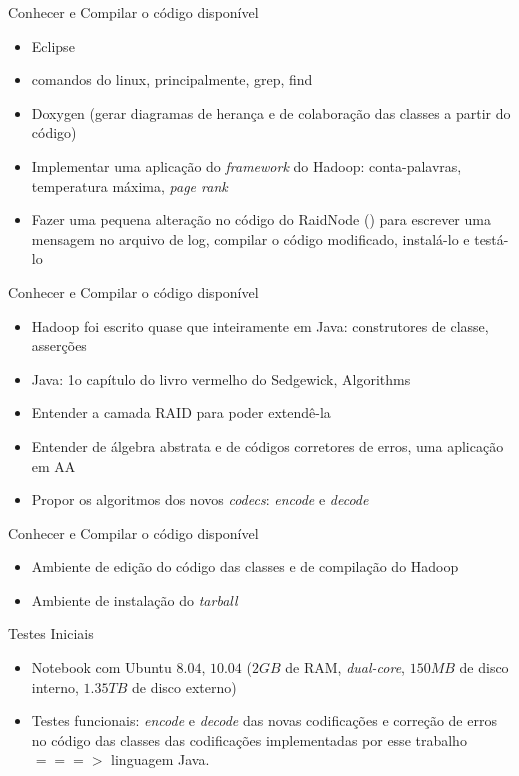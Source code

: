   \begin{frame}{Conhecer e Compilar o código disponível}
     \begin{itemize}
        \item<1-> Eclipse
        \item<2-> comandos do linux, principalmente, grep, find
        \item<3-> Doxygen (gerar diagramas de herança e de colaboração das classes a partir do código)
        \item<4-> Implementar uma aplicação do \emph{framework} do Hadoop: conta-palavras, temperatura máxima, \emph{page rank}
        \item<5-> Fazer uma pequena alteração no código do RaidNode () para escrever uma mensagem no arquivo de log, compilar o código modificado, instalá-lo e testá-lo
     \end{itemize}
  \end{frame}

  \begin{frame}{Conhecer e Compilar o código disponível}
     \begin{itemize}
        \item<1-> Hadoop foi escrito quase que inteiramente em Java: construtores de classe, asserções
        \item<2-> Java: 1o capítulo do livro vermelho do Sedgewick, Algorithms
        \item<3-> Entender a camada RAID para poder extendê-la
        \item<4-> Entender de álgebra abstrata e de códigos corretores de erros, uma aplicação em AA
        \item<5-> Propor os algoritmos dos novos \emph{codecs}: \emph{encode} e \emph{decode}
     \end{itemize}
  \end{frame}

  \begin{frame}{Conhecer e Compilar o código disponível}
     \begin{itemize}
        \item<1-> Ambiente de edição do código das classes e de compilação do Hadoop 
        \item<2-> Ambiente de instalação do \emph{tarball}
     \end{itemize}
  \end{frame}

  \begin{frame}{Testes Iniciais}
     \begin{itemize}
        \item<1-> Notebook com Ubuntu $8.04$, $10.04$ ($2GB$ de RAM, \emph{dual-core}, $150MB$ de disco interno, $1.35TB$ de disco externo) 
        \item<2-> Testes funcionais: \emph{encode} e \emph{decode} das novas codificações e correção de erros no código das classes das codificações implementadas por esse trabalho $===>$ linguagem Java.
     \end{itemize}
  \end{frame}

